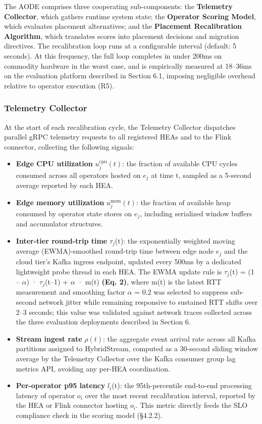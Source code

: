 \documentclass[preprint,review,12pt]{elsarticle}
\providecommand{\tightlist}{\setlength{\itemsep}{0pt}\setlength{\parskip}{0pt}}
\begin{document}
The AODE comprises three cooperating sub-components: the \textbf{Telemetry Collector}, which gathers runtime system state; the \textbf{Operator Scoring Model}, which evaluates placement alternatives; and the \textbf{Placement Recalibration Algorithm}, which translates scores into placement decisions and migration directives. The recalibration loop runs at a configurable interval (default: 5 seconds). At this frequency, the full loop completes in under 200ms on commodity hardware in the worst case, and is empirically measured at 18--36ms on the evaluation platform described in Section 6.1, imposing negligible overhead relative to operator execution (R5).

\subsubsection{Telemetry Collector}\label{telemetry-collector}

At the start of each recalibration cycle, the Telemetry Collector dispatches parallel gRPC telemetry requests to all registered HEAs and to the Flink connector, collecting the following signals:

\begin{itemize}
\tightlist
\item
  \textbf{Edge CPU utilization} $u_j^{\text{cpu}}(t)$: the fraction of available CPU cycles consumed across all operators hosted on $e_j$ at time t, sampled as a 5-second average reported by each HEA.
\item
  \textbf{Edge memory utilization} $u_j^{\text{mem}}(t)$: the fraction of available heap consumed by operator state stores on $e_j$, including serialized window buffers and accumulator structures.
\item
  \textbf{Inter-tier round-trip time} $\tau_j$(t): the exponentially weighted moving average (EWMA)-smoothed round-trip time between edge node $e_j$ and the cloud tier's Kafka ingress endpoint, updated every 500ms by a dedicated lightweight probe thread in each HEA. The EWMA update rule is $\tau_j$(t) = (1 -- $\alpha$) · $\tau_j$(t--1) + $\alpha$ · m(t) \textbf{(Eq. 2)}, where m(t) is the latest RTT measurement and smoothing factor $\alpha$ = 0.2 was selected to suppress sub-second network jitter while remaining responsive to sustained RTT shifts over 2--3 seconds; this value was validated against network traces collected across the three evaluation deployments described in Section 6.
\item
  \textbf{Stream ingest rate} $\rho(t)$: the aggregate event arrival rate across all Kafka partitions assigned to HybridStream, computed as a 30-second sliding window average by the Telemetry Collector over the Kafka consumer group lag metrics API, avoiding any per-HEA coordination.
\item
  \textbf{Per-operator p95 latency} $l_i$(t): the 95th-percentile end-to-end processing latency of operator $o_i$ over the most recent recalibration interval, reported by the HEA or Flink connector hosting $o_i$. This metric directly feeds the SLO compliance check in the scoring model (§4.2.2).
\end{itemize}
\end{document}
